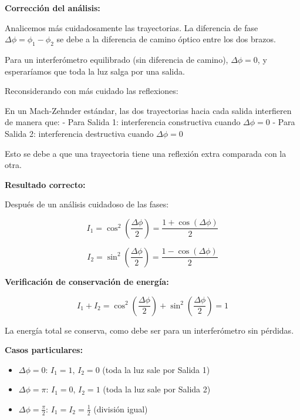 \documentclass[12pt,a4paper]{article}
\begin{document}
\textbf{Corrección del análisis:}

Analicemos más cuidadosamente las trayectorias. La diferencia de fase $\Delta\phi = \phi_1 - \phi_2$ se debe a la diferencia de camino óptico entre los dos brazos.

Para un interferómetro equilibrado (sin diferencia de camino), $\Delta\phi = 0$, y esperaríamos que toda la luz salga por una salida.

Reconsiderando con más cuidado las reflexiones:

En un Mach-Zehnder estándar, las dos trayectorias hacia cada salida interfieren de manera que:
- Para Salida 1: interferencia constructiva cuando $\Delta\phi = 0$
- Para Salida 2: interferencia destructiva cuando $\Delta\phi = 0$

Esto se debe a que una trayectoria tiene una reflexión extra comparada con la otra.

\textbf{Resultado correcto:}

Después de un análisis cuidadoso de las fases:

\begin{equation}
    \boxed{I_1 = \cos^2\left(\frac{\Delta\phi}{2}\right) = \frac{1 + \cos(\Delta\phi)}{2}}
\end{equation}

\begin{equation}
    \boxed{I_2 = \sin^2\left(\frac{\Delta\phi}{2}\right) = \frac{1 - \cos(\Delta\phi)}{2}}
\end{equation}

\textbf{Verificación de conservación de energía:}

\begin{equation}
    I_1 + I_2 = \cos^2\left(\frac{\Delta\phi}{2}\right) + \sin^2\left(\frac{\Delta\phi}{2}\right) = 1
\end{equation}

La energía total se conserva, como debe ser para un interferómetro sin pérdidas.

\textbf{Casos particulares:}

\begin{itemize}
    \item $\Delta\phi = 0$: $I_1 = 1$, $I_2 = 0$ (toda la luz sale por Salida 1)
    \item $\Delta\phi = \pi$: $I_1 = 0$, $I_2 = 1$ (toda la luz sale por Salida 2)
    \item $\Delta\phi = \frac{\pi}{2}$: $I_1 = I_2 = \frac{1}{2}$ (división igual)
\end{itemize}
\end{document}
